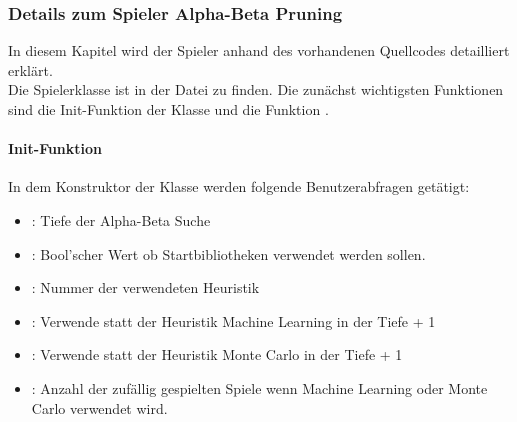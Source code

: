 \subsubsection{Details zum Spieler Alpha-Beta Pruning}
In diesem Kapitel wird der Spieler  anhand des vorhandenen Quellcodes detailliert erklärt.
\\Die Spielerklasse  ist in der Datei  zu finden.
Die zunächst wichtigsten Funktionen sind die Init-Funktion der Klasse und die Funktion .
\paragraph{Init-Funktion}
In dem Konstruktor der Klasse  werden folgende Benutzerabfragen getätigt:
\begin{itemize}
\item {}: Tiefe der Alpha-Beta Suche
\item {}: Bool'scher Wert ob Startbibliotheken verwendet werden sollen.
\item {}: Nummer der verwendeten Heuristik
\item {}: Verwende statt der Heuristik Machine Learning in der Tiefe  + 1
\item {}: Verwende statt der Heuristik Monte Carlo in der Tiefe  + 1
\item {}: Anzahl der zufällig gespielten Spiele wenn Machine Learning oder Monte Carlo verwendet wird.
\end{itemize}

